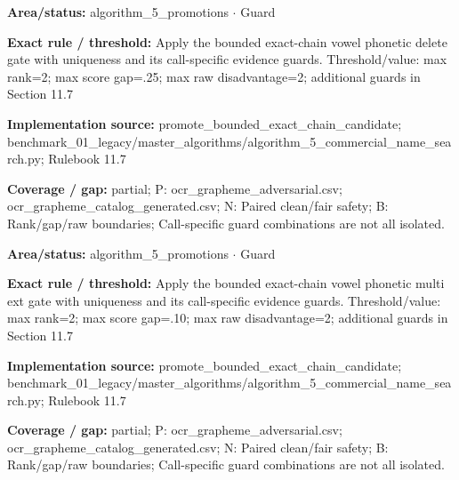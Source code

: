 \begin{tcolorbox}[enhanced,breakable,colback=white,colframe=Muted!45,boxrule=0.45pt,arc=1.5pt,left=6pt,right=6pt,top=5pt,bottom=5pt,title={\texttt{A5-CHAIN-VOWEL-PHONETIC-DELETE}},title after break={\texttt{A5-CHAIN-VOWEL-PHONETIC-DELETE}\ (continued)},fonttitle=\headingfont\bfseries\color{Navy},coltitle=Navy]
\textbf{Area/status:} algorithm\_\allowbreak{}5\_\allowbreak{}promotions $\boldsymbol{\cdot}$ Guard\par
\smallskip
\textbf{Exact rule / threshold:} Apply the bounded exact-chain vowel phonetic delete gate with uniqueness and its call-specific evidence guards. Threshold/\allowbreak{}value: max rank=2; max score gap=.25; max raw disadvantage=2; additional guards in Section 11.7\par
\smallskip
\textbf{Implementation source:} promote\_\allowbreak{}bounded\_\allowbreak{}exact\_\allowbreak{}chain\_\allowbreak{}candidate; benchmark\_\allowbreak{}01\_\allowbreak{}legacy/\allowbreak{}master\_\allowbreak{}algorithms/\allowbreak{}algorithm\_\allowbreak{}5\_\allowbreak{}commercial\_\allowbreak{}name\_\allowbreak{}search.py; Rulebook 11.7\par
\smallskip
\textbf{Coverage / gap:} partial; P: ocr\_\allowbreak{}grapheme\_\allowbreak{}adversarial.csv; ocr\_\allowbreak{}grapheme\_\allowbreak{}catalog\_\allowbreak{}generated.csv; N: Paired clean/\allowbreak{}fair safety; B: Rank/\allowbreak{}gap/\allowbreak{}raw boundaries; Call-specific guard combinations are not all isolated.
\end{tcolorbox}
\begin{tcolorbox}[enhanced,breakable,colback=white,colframe=Muted!45,boxrule=0.45pt,arc=1.5pt,left=6pt,right=6pt,top=5pt,bottom=5pt,title={\texttt{A5-CHAIN-VOWEL-PHONETIC-MULTI-EXT}},title after break={\texttt{A5-CHAIN-VOWEL-PHONETIC-MULTI-EXT}\ (continued)},fonttitle=\headingfont\bfseries\color{Navy},coltitle=Navy]
\textbf{Area/status:} algorithm\_\allowbreak{}5\_\allowbreak{}promotions $\boldsymbol{\cdot}$ Guard\par
\smallskip
\textbf{Exact rule / threshold:} Apply the bounded exact-chain vowel phonetic multi ext gate with uniqueness and its call-specific evidence guards. Threshold/\allowbreak{}value: max rank=2; max score gap=.10; max raw disadvantage=2; additional guards in Section 11.7\par
\smallskip
\textbf{Implementation source:} promote\_\allowbreak{}bounded\_\allowbreak{}exact\_\allowbreak{}chain\_\allowbreak{}candidate; benchmark\_\allowbreak{}01\_\allowbreak{}legacy/\allowbreak{}master\_\allowbreak{}algorithms/\allowbreak{}algorithm\_\allowbreak{}5\_\allowbreak{}commercial\_\allowbreak{}name\_\allowbreak{}search.py; Rulebook 11.7\par
\smallskip
\textbf{Coverage / gap:} partial; P: ocr\_\allowbreak{}grapheme\_\allowbreak{}adversarial.csv; ocr\_\allowbreak{}grapheme\_\allowbreak{}catalog\_\allowbreak{}generated.csv; N: Paired clean/\allowbreak{}fair safety; B: Rank/\allowbreak{}gap/\allowbreak{}raw boundaries; Call-specific guard combinations are not all isolated.
\end{tcolorbox}
\medskip
